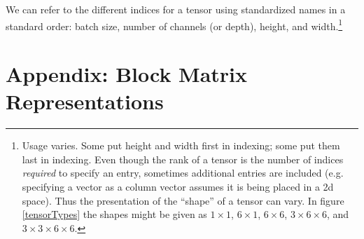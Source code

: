We can refer to the different indices for a tensor using standardized names in a standard order: batch size, number of channels (or depth), height, and width.\footnote{Usage varies. Some put height and width first in indexing; some put them last in indexing. Even though the rank of a tensor is the number of indices \emph{required} to specify an entry, sometimes additional entries are included (e.g. specifying a vector as a column vector assumes it is being placed in a 2d space). Thus the presentation of the ``shape'' of a tensor can vary.  In figure \ref{tensorTypes} the shapes might be given as $1 \times 1$, $6 \times 1$, $6 \times 6$, $3 \times 6 \times 6$, and $3 \times 3 \times 6 \times 6$.}



\section{Appendix: Block Matrix Representations}

